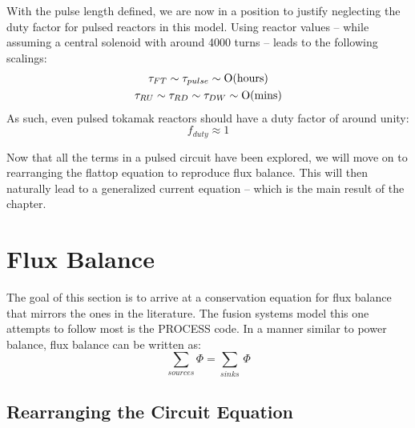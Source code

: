 With the pulse length defined, we are now in a position to justify neglecting the duty factor for pulsed reactors in this model. Using  reactor values -- while assuming a central solenoid with around 4000 turns -- leads to the following scalings:
\begin{gather}
	\tau_{FT} \sim \tau_{pulse} \sim \textnormal{O(hours)} \\
	\tau_{RU} \sim \tau_{RD} \sim \tau_{DW} \sim \textnormal{O(mins)}
\end{gather}
As such, even pulsed tokamak reactors should have a duty factor of around unity:
\begin{equation}
	f_{duty} \approx 1
\end{equation}

Now that all the terms in a pulsed circuit have been explored, we will move on to rearranging the flattop equation to reproduce flux balance. This will then naturally lead to a generalized current equation -- which is the main result of the chapter.

\section{ Flux Balance}

The goal of this section is to arrive at a conservation equation for flux balance that mirrors the ones in the literature. The fusion systems model this one attempts to follow most is the PROCESS code.\cite{process} In a manner similar to power balance, flux balance can be written as:
\begin{equation}
	\sum_{sources} \Phi = \sum_{sinks} \, \Phi
\end{equation}

\subsection{Rearranging the Circuit Equation}

